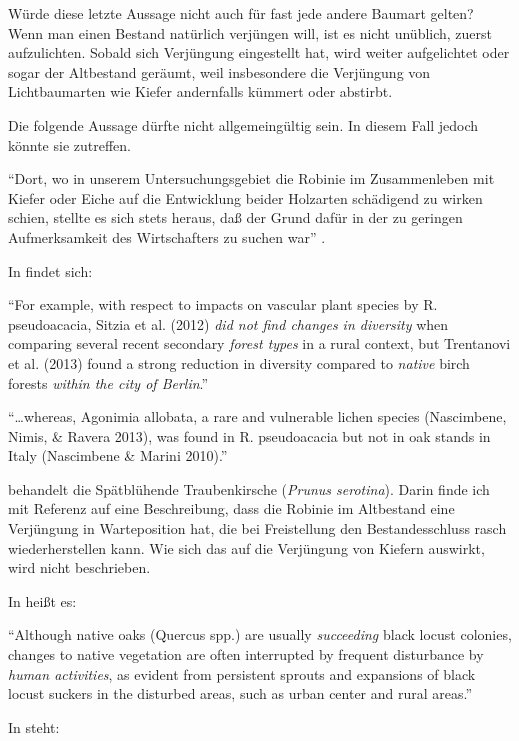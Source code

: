\documentclass[twocolumn]{scrartcl}
\begin{document}
Würde diese letzte Aussage nicht auch für fast jede andere Baumart
gelten? Wenn man einen Bestand natürlich verjüngen will, ist es nicht
unüblich, zuerst aufzulichten. Sobald sich Verjüngung eingestellt hat,
wird weiter aufgelichtet oder sogar der Altbestand geräumt, weil
insbesondere die Verjüngung von Lichtbaumarten wie Kiefer andernfalls
kümmert oder abstirbt.

Die folgende Aussage dürfte nicht allgemeingültig sein. In diesem Fall
jedoch könnte sie zutreffen.

\enquote{Dort, wo in unserem Untersuchungsgebiet die Robinie im
  Zusammenleben mit Kiefer oder Eiche auf die Entwicklung beider
  Holzarten schädigend zu wirken schien, stellte es sich stets heraus,
  daß der Grund dafür in der zu geringen Aufmerksamkeit des
  Wirtschafters zu suchen war} \citep[S.~90]{erteld1952robinieErtrag}.

In \cite{campagnaro2018alien} findet sich:

\enquote{For example, with respect to impacts on vascular plant
  species by R.  pseudoacacia, Sitzia et al. (2012) \emph{did not find
  changes in diversity} when comparing several recent secondary
  \emph{forest types} in a rural context, but Trentanovi et al. (2013)
  found a strong reduction in diversity compared to \emph{native}
  birch forests \emph{within the city of Berlin}.}

\enquote{\dots whereas, Agonimia allobata, a rare and vulnerable
  lichen species (Nascimbene, Nimis, \& Ravera 2013), was found in
  R. pseudoacacia but not in oak stands in Italy (Nascimbene \& Marini
  2010).}

\citet{sebert2007invasive} behandelt die Spätblühende Traubenkirsche
(\emph{Prunus serotina}). Darin finde ich mit Referenz auf
\citet{lee2004robinie} eine Beschreibung, dass die Robinie im
Altbestand eine Verjüngung in Warteposition hat, die bei Freistellung
den Bestandesschluss rasch wiederherstellen kann. Wie sich das auf die
Verjüngung von Kiefern auswirkt, wird nicht beschrieben.

In \citet{lee2004robinie} heißt es:

\enquote{Although native oaks (Quercus spp.) are usually
  \emph{succeeding} black locust colonies, changes to native
  vegetation are often interrupted by frequent disturbance by
  \emph{human activities}, as evident from persistent sprouts and
  expansions of black locust suckers in the disturbed areas, such as
  urban center and rural areas.}

In \citet{maringer2012robinePostFire} steht:
\end{document}
